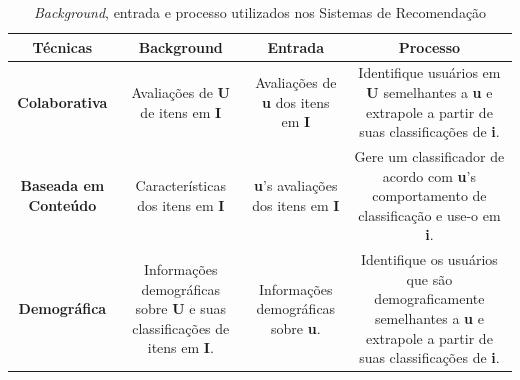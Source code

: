 \begin{table}[]
	\centering
	\caption{\emph{Background}, entrada e processo utilizados nos Sistemas de Recomendação}
	\label{tab02}
	\begin{tabular}{|c|c|c|c|}
	\hline
	\rowcolor[HTML]{C0C0C0} 
	\textbf{Técnicas} & \textbf{Background} & \textbf{Entrada}  &  \textbf{Processo}  \\ \hline
	\textbf{Colaborativa} & \begin{minipage} [t] {0.2\textwidth} \centering Avaliações de \textbf{U} de itens em \textbf{I}  \end{minipage}  & \begin{minipage} [t] {0.2\textwidth} \centering Avaliações de \textbf{u} dos itens em \textbf{I} \end{minipage}  &  \begin{minipage} [t] {0.2\textwidth}  Identifique usuários em \textbf{U} semelhantes a \textbf{u} e extrapole a partir de suas classificações de \textbf{i}.   \end{minipage}    \\ \hline
	\rowcolor[HTML]{EFEFEF} 
	\textbf{Baseada em Conteúdo} & \begin{minipage} [t] {0.2\textwidth} \centering Características dos itens em \textbf{I}\end{minipage}  & \begin{minipage} [t] {0.2\textwidth} \textbf{u}'s avaliações dos itens em \textbf{I} \end{minipage}  &   \begin{minipage} [t] {0.2\textwidth} Gere um classificador de acordo com \textbf{u}'s comportamento de classificação e use-o em \textbf{i}. \end{minipage} \\ \hline
	\textbf{Demográfica} & \begin{minipage} [t] {0.2\textwidth} \centering Informações demográficas sobre \textbf{U} e suas classificações de itens em \textbf{I}.    \end{minipage}   & \begin{minipage} [t] {0.2\textwidth} Informações demográficas sobre \textbf{u}. \end{minipage}  & \begin{minipage} [t] {0.2\textwidth} Identifique os usuários que são demograficamente semelhantes a \textbf{u} e extrapole a partir de suas classificações de \textbf{i}. \end{minipage}   \\ \hline

\end{tabular}
\end{table}
